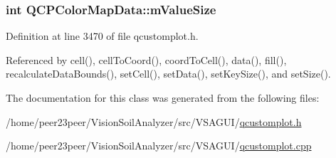 \subsubsection[{m\+Value\+Size}]{\setlength{\rightskip}{0pt plus 5cm}int Q\+C\+P\+Color\+Map\+Data\+::m\+Value\+Size\hspace{0.3cm}{\ttfamily [protected]}}\label{class_q_c_p_color_map_data_ae8ee9093632a59f55eb4fc06579ed256}


Definition at line 3470 of file qcustomplot.\+h.



Referenced by cell(), cell\+To\+Coord(), coord\+To\+Cell(), data(), fill(), recalculate\+Data\+Bounds(), set\+Cell(), set\+Data(), set\+Key\+Size(), and set\+Size().



The documentation for this class was generated from the following files\+:\begin{DoxyCompactItemize}
\item 
/home/peer23peer/\+Vision\+Soil\+Analyzer/src/\+V\+S\+A\+G\+U\+I/\hyperlink{qcustomplot_8h}{qcustomplot.\+h}\item 
/home/peer23peer/\+Vision\+Soil\+Analyzer/src/\+V\+S\+A\+G\+U\+I/\hyperlink{qcustomplot_8cpp}{qcustomplot.\+cpp}\end{DoxyCompactItemize}
